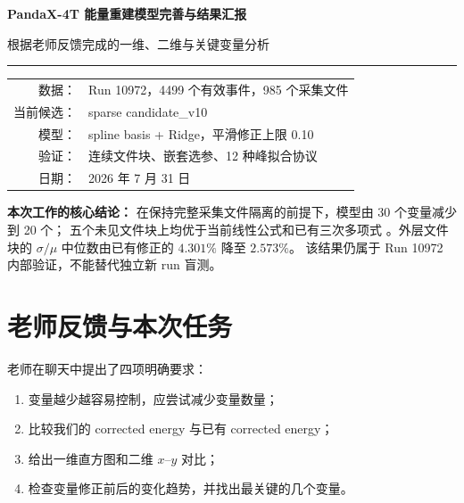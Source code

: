 \documentclass[11pt,a4paper]{ctexart}
\newcommand{\var}[1]{\texttt{\detokenize{#1}}}
\begin{document}
\begin{titlepage}
  \centering
  \vspace*{2.2cm}
  {\Huge\bfseries\color{pandaxblue}
  PandaX-4T 能量重建模型完善与结果汇报\par}
  \vspace{0.8cm}
  {\Large 根据老师反馈完成的一维、二维与关键变量分析\par}
  \vspace{1.4cm}
  \rule{0.78\textwidth}{1.1pt}
  \vspace{1.2cm}

  \begin{tabular}{rl}
    数据：& Run 10972，4499 个有效事件，985 个采集文件\\
    当前候选：& sparse candidate\_v10\\
    模型：& spline basis + Ridge，平滑修正上限 0.10\\
    验证：& 连续文件块、嵌套选参、12 种峰拟合协议\\
    日期：& 2026 年 7 月 31 日
  \end{tabular}

  \vfill
  \begin{minipage}{0.86\textwidth}
    \colorbox{softgray}{
      \parbox{0.92\textwidth}{
      \textbf{本次工作的核心结论：}
      在保持完整采集文件隔离的前提下，模型由 30 个变量减少到 20 个；
      五个未见文件块上均优于当前线性公式和已有三次多项式
      \var{Energy_cor}。外层文件块的
      $\sigma/\mu$ 中位数由已有修正的 $4.301\%$ 降至 $2.573\%$。
      该结果仍属于 Run 10972 内部验证，不能替代独立新 run 盲测。
      }
    }
  \end{minipage}
\end{titlepage}

\tableofcontents
\clearpage

\section{老师反馈与本次任务}

老师在聊天中提出了四项明确要求：

\begin{enumerate}
  \item 变量越少越容易控制，应尝试减少变量数量；
  \item 比较我们的 corrected energy 与已有 corrected energy；
  \item 给出一维直方图和二维 $x$--$y$ 对比；
  \item 检查变量修正前后的变化趋势，并找出最关键的几个变量。
\end{enumerate}
\end{document}
